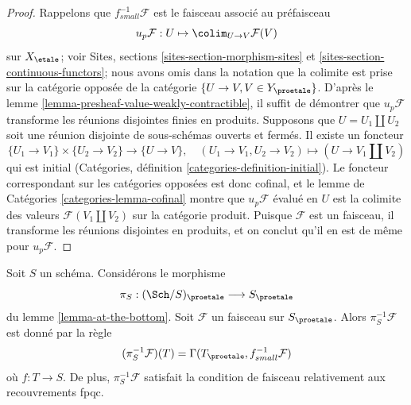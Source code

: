 \begin{proof}
Rappelons que $f_{small}^{-1}\mathcal{F}$ est le faisceau associé au
préfaisceau
$$
u_p\mathcal{F} : U \mapsto \colim_{U \to V} \mathcal{F}(V)
$$
sur $X_\etale$; voir Sites, sections \ref{sites-section-morphism-sites} et
\ref{sites-section-continuous-functors}; nous avons omis dans la notation
que la colimite est prise sur la catégorie opposée de la catégorie
$\{U \to V, V \in Y_\proetale\}$. D'après le
lemme \ref{lemma-presheaf-value-weakly-contractible},
il suffit de démontrer que $u_p\mathcal{F}$ transforme les réunions disjointes finies
en produits.
Supposons que $U = U_1 \amalg U_2$ soit une réunion disjointe de sous-schémas
ouverts et fermés. Il existe un foncteur
$$
\{U_1 \to V_1\} \times \{U_2 \to V_2\} \longrightarrow
\{U \to V\},\quad
(U_1 \to V_1, U_2 \to V_2) \longmapsto (U \to V_1 \amalg V_2)
$$
qui est initial (Catégories, définition \ref{categories-definition-initial}).
Le foncteur correspondant sur les catégories opposées est donc cofinal, et
le lemme de Catégories \ref{categories-lemma-cofinal} montre
que $u_p\mathcal{F}$ évalué en $U$ est la colimite des valeurs
$\mathcal{F}(V_1 \amalg V_2)$ sur la catégorie produit.
Puisque $\mathcal{F}$ est un faisceau, il transforme les réunions disjointes en produits, et
on conclut qu'il en est de même pour $u_p\mathcal{F}$.
\end{proof}

\begin{lemma}
\label{lemma-describe-pullback}
Soit $S$ un schéma. Considérons le morphisme
$$
\pi_S : (\Sch/S)_\proetale \longrightarrow S_\proetale
$$
du lemme \ref{lemma-at-the-bottom}. Soit $\mathcal{F}$ un faisceau sur
$S_\proetale$. Alors $\pi_S^{-1}\mathcal{F}$ est donné par la règle
$$
(\pi_S^{-1}\mathcal{F})(T) = \Gamma(T_\proetale, f_{small}^{-1}\mathcal{F})
$$
où $f : T \to S$. De plus, $\pi_S^{-1}\mathcal{F}$ satisfait la
condition de faisceau relativement aux recouvrements fpqc.
\end{lemma}

